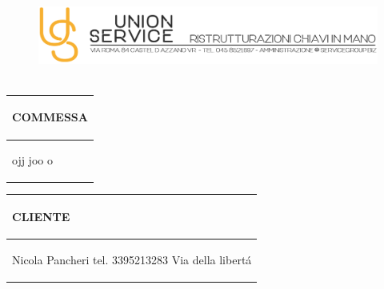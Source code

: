 \documentclass[a4paper]{article}
\begin{document}
                        \begin{figure}[!t]
                        \includegraphics[width=15.8cm, height=3cm]{intestazioneAlta2.jpg}
                        \end{figure}

                        \noindent\begin{tabular}{| L{72.2mm} |}
                            \hline
                            \vspace{2.5mm}
                            \begin{spacing}{0}
                            \textbf{COMMESSA}
                            \end{spacing}\\
                            \hline
                            \vspace{4mm}
                            \begin{spacing}{1.2}

                        ojj \newline joo \newline o
                          \end{spacing}\\
                            \hline
                          \end{tabular}
                          \quad
                          \begin{tabular}{ | R{72.2mm} | }
                            \hline
                            \vspace{2.5mm}
                            \begin{spacing}{0}
                            \textbf{CLIENTE}
                            \end{spacing}\\
                            \hline
                            \vspace{4mm}
                            \begin{spacing}{1.2}

                       Nicola Pancheri \newline tel. 3395213283 \newline Via della libert\'a
                          \end{spacing}\\
                            \hline
                          \end{tabular}
\end{document}
